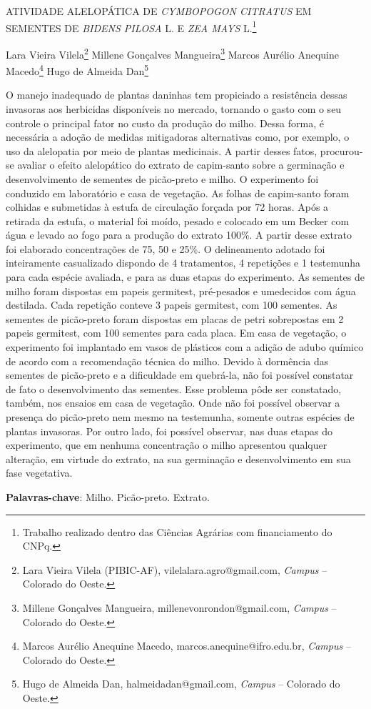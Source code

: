 \documentclass[article,12pt,onesidea,4paper,english,brazil]{abntex2}
\begin{document}
	
	
	\frenchspacing 
	
	\begin{center}
		\LARGE ATIVIDADE ALELOPÁTICA DE \textit{CYMBOPOGON CITRATUS} EM SEMENTES DE \textit{BIDENS PILOSA} L. E \textit{ZEA MAYS} L.\footnote{Trabalho realizado dentro das Ciências Agrárias com financiamento do CNPq.}
		
		\normalsize
		Lara Vieira Vilela\footnote{Lara Vieira Vilela (PIBIC-AF), vilelalara.agro@gmail.com, \textit{Campus} – Colorado do Oeste.} 
		Millene Gonçalves Mangueira\footnote{Millene Gonçalves Mangueira, millenevonrondon@gmail.com, \textit{Campus} – Colorado do Oeste.} 
		Marcos Aurélio Anequine Macedo\footnote{Marcos Aurélio Anequine Macedo, marcos.anequine@ifro.edu.br, \textit{Campus} – Colorado do Oeste.} 
		Hugo de Almeida Dan\footnote{Hugo de Almeida Dan, halmeidadan@gmail.com, \textit{Campus} – Colorado do Oeste.} 
	\end{center}
	
	\noindent O manejo inadequado de plantas daninhas tem propiciado a resistência dessas
	invasoras aos herbicidas disponíveis no mercado, tornando o gasto com o seu
	controle o principal fator no custo da produção do milho. Dessa forma, é necessária
	a adoção de medidas mitigadoras alternativas como, por exemplo, o uso da
	alelopatia por meio de plantas medicinais. A partir desses fatos, procurou-se avaliar
	o efeito alelopático do extrato de capim-santo sobre a germinação e
	desenvolvimento de sementes de picão-preto e milho. O experimento foi conduzido
	em laboratório e casa de vegetação. As folhas de capim-santo foram colhidas e
	submetidas à estufa de circulação forçada por 72 horas. Após a retirada da estufa, o
	material foi moído, pesado e colocado em um Becker com água e levado ao fogo
	para a produção do extrato 100\%. A partir desse extrato foi elaborado concentrações
	de 75, 50 e 25\%. O delineamento adotado foi inteiramente casualizado dispondo de
	4 tratamentos, 4 repetições e 1 testemunha para cada espécie avaliada, e para as
	duas etapas do experimento. As sementes de milho foram dispostas em papeis
	germitest, pré-pesados e umedecidos com água destilada. Cada repetição conteve 3
	papeis germitest, com 100 sementes. As sementes de picão-preto foram dispostas
	em placas de petri sobrepostas em 2 papeis germitest, com 100 sementes para cada
	placa. Em casa de vegetação, o experimento foi implantado em vasos de plásticos
	com a adição de adubo químico de acordo com a recomendação técnica do milho.
	Devido à dormência das sementes de picão-preto e a dificuldade em quebrá-la, não
	foi possível constatar de fato o desenvolvimento das sementes. Esse problema pôde
	ser constatado, também, nos ensaios em casa de vegetação. Onde não foi possível
	observar a presença do picão-preto nem mesmo na testemunha, somente outras
	espécies de plantas invasoras. Por outro lado, foi possível observar, nas duas
	etapas do experimento, que em nenhuma concentração o milho apresentou qualquer
	alteração, em virtude do extrato, na sua germinação e desenvolvimento em sua fase
	vegetativa.
	
	\vspace{\onelineskip}
	
	\noindent
	\textbf{Palavras-chave}: Milho. Picão-preto. Extrato.
	
\end{document}
